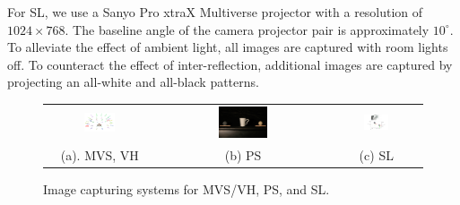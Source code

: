 For SL, we use a Sanyo Pro xtraX Multiverse projector with a resolution of $1024\times 768$. The baseline angle of the camera projector pair is approximately $10^\circ$. To alleviate the effect of ambient light, all images are captured with room lights off. To counteract the effect of inter-reflection, additional images are captured by projecting an all-white and all-black patterns.

\begin{figure}[!htbp]
\centering
\begin{tabular}{ccc}

\includegraphics[width=0.3\textwidth]{img/interp/setup/mvs_setup.PNG} &
\includegraphics[width=0.3\textwidth]{img/interp/setup/ps_setup.JPG} &
\includegraphics[width=0.3\textwidth]{img/interp/setup/sl_setup.png}\\
(a). MVS, VH & (b) PS & (c) SL \\
\end{tabular}
\caption{Image capturing systems for MVS/VH, PS, and SL.}
\label{fig:setup}
\end{figure}

